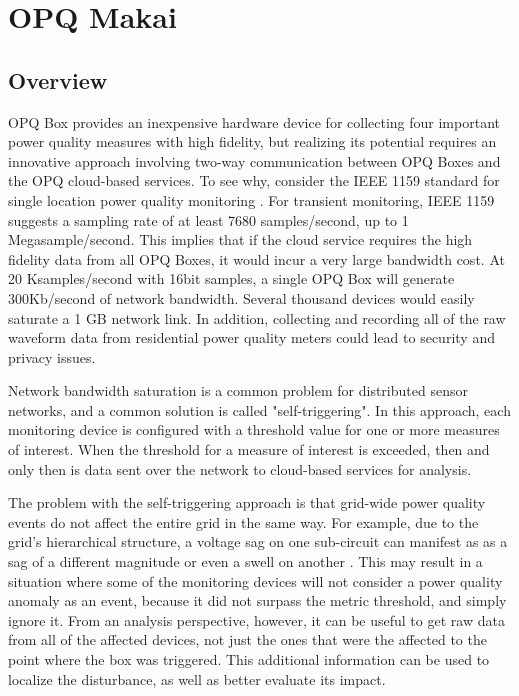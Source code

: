 \section{OPQ Makai}
\label{sec:opq-makai}

\subsection{Overview}

OPQ Box provides an inexpensive hardware device for collecting four important power quality measures with high fidelity, but realizing its potential requires an innovative approach involving two-way communication between OPQ Boxes and the OPQ cloud-based services. To see why, consider the IEEE 1159 standard for single location power quality monitoring \cite{unruh_ieee_2018}.  For transient monitoring, IEEE 1159 suggests a sampling rate of at least 7680 samples/second, up to 1 Megasample/second. This implies that if the cloud service requires the high fidelity data from all OPQ Boxes, it would incur a very large bandwidth cost. At 20 Ksamples/second with 16bit samples, a single OPQ Box will generate 300Kb/second of network bandwidth. Several thousand devices would easily saturate a 1 GB network link. In addition, collecting and recording all of the raw waveform data from residential power quality meters could lead to security and privacy issues.

Network bandwidth saturation is a common problem for distributed sensor networks, and a common solution is called "self-triggering".  In this approach, each monitoring device is configured with a threshold value for one or more measures of interest. When the threshold for a measure of interest is exceeded, then and only then is data sent over the network to cloud-based services for analysis.

The problem with the self-triggering approach is that grid-wide power quality events do not affect the entire grid in the same way. For example, due to the grid’s hierarchical structure, a voltage sag on one sub-circuit can manifest as as a sag of a different magnitude or even a swell on another \cite{kahle_power_2015}. This may result in a situation where some of the monitoring devices will not consider a power quality anomaly as an event, because it did not surpass the metric threshold, and simply ignore it. From an analysis perspective, however, it can be useful to get raw data from all of the affected devices, not just the ones that were the affected to the point where the box was triggered. This additional information can be used to localize the disturbance, as well as better evaluate its impact.

